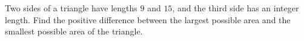 Two sides of a triangle have lengths $9$ and $15$, and the third side has an integer length. Find the positive difference between the largest possible area and the smallest possible area of the triangle.

